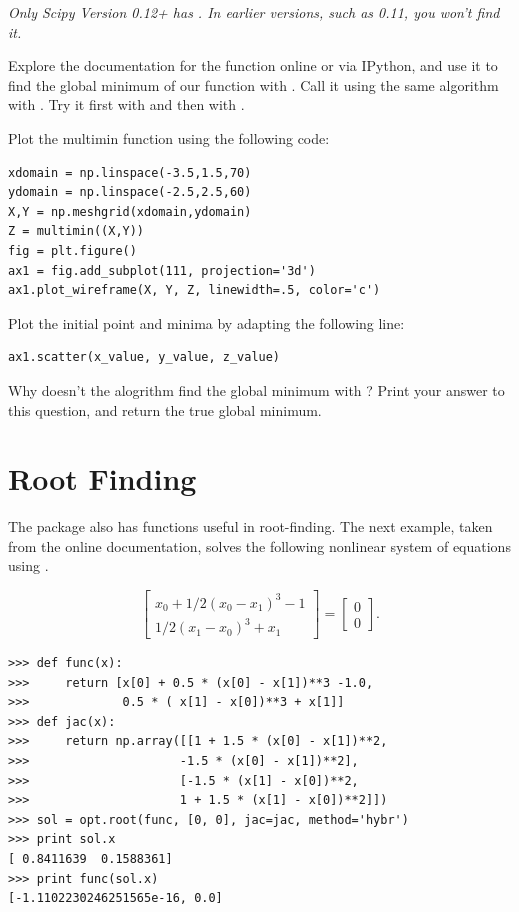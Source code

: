 \emph{Only Scipy Version 0.12+ has . In earlier versions, such as 0.11, you won't find it.}

\begin{problem} %
Explore the documentation for the  function online or via IPython, and use it to find the global minimum of our  function with .
Call it using the same  algorithm with .
Try it first with  and then with . 

Plot the multimin function using the following code:
\begin{lstlisting}
xdomain = np.linspace(-3.5,1.5,70)
ydomain = np.linspace(-2.5,2.5,60)
X,Y = np.meshgrid(xdomain,ydomain)
Z = multimin((X,Y))
fig = plt.figure()
ax1 = fig.add_subplot(111, projection='3d')
ax1.plot_wireframe(X, Y, Z, linewidth=.5, color='c')
\end{lstlisting}

Plot the initial point and minima by adapting the following line:
\begin{lstlisting}
ax1.scatter(x_value, y_value, z_value)     
\end{lstlisting}

Why doesn't the alogrithm find the global minimum with ?
Print your answer to this question, and return the true global minimum.
\end{problem}

\section*{Root Finding} %

The  package also has functions useful in root-finding.
The next example, taken from the online documentation, solves the following nonlinear system of equations using .

\[
\begin{bmatrix}
	x_{0} + 1/2 ( x_{0} - x_{1} )^{3} - 1 \\
	1/2(x_{1}-x_{0})^{3} + x_{1}
\end{bmatrix} =
\begin{bmatrix}
	0 \\
	0
\end{bmatrix}.
\]

\begin{lstlisting}
>>> def func(x):
>>>     return [x[0] + 0.5 * (x[0] - x[1])**3 -1.0,
>>>             0.5 * ( x[1] - x[0])**3 + x[1]]
>>> def jac(x):
>>>     return np.array([[1 + 1.5 * (x[0] - x[1])**2,
>>>                     -1.5 * (x[0] - x[1])**2],
>>>                     [-1.5 * (x[1] - x[0])**2,
>>>                     1 + 1.5 * (x[1] - x[0])**2]])
>>> sol = opt.root(func, [0, 0], jac=jac, method='hybr')
>>> print sol.x
[ 0.8411639  0.1588361]
>>> print func(sol.x)
[-1.1102230246251565e-16, 0.0]
\end{lstlisting}


